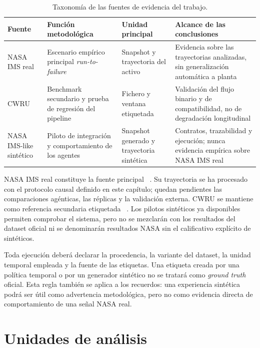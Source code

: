 \begin{table}[htbp]
\centering
\caption{Taxonomía de las fuentes de evidencia del trabajo.}\label{tab:taxonomia_evidencia}
\small
\begin{tabularx}{\textwidth}{>{\raggedright\arraybackslash}p{}Y>{\raggedright\arraybackslash}p{0.18\textwidth}Y}
\toprule
Fuente & Función metodológica & Unidad principal & Alcance de las conclusiones \\
\midrule
NASA IMS real & Escenario empírico principal \textit{run-to-failure} & Snapshot y trayectoria del activo & Evidencia sobre las trayectorias analizadas, sin generalización automática a planta \\
CWRU & Benchmark secundario y prueba de regresión del pipeline & Fichero y ventana etiquetada & Validación del flujo binario y de compatibilidad, no de degradación longitudinal \\
NASA IMS-like sintético & Piloto de integración y comportamiento de los agentes & Snapshot generado y trayectoria sintética & Contratos, trazabilidad y ejecución; nunca evidencia empírica sobre NASA IMS real \\
\bottomrule
\end{tabularx}
\end{table}

NASA IMS real constituye la fuente principal
~\cite{nasa_pcoe_repository,nasa_ims_bearings_zip}. Su trayectoria se ha
procesado con el protocolo causal definido en este capítulo; quedan pendientes
las comparaciones agénticas, las réplicas y la validación externa. CWRU se
mantiene como referencia secundaria etiquetada
~\cite{cwru_bearing_data_center,cwru_normal_baseline,cwru_12k_drive_end}. Los
pilotos sintéticos ya disponibles permiten comprobar el sistema, pero no se
mezclarán con los resultados del dataset oficial ni se denominarán resultados
NASA sin el calificativo explícito de sintéticos.

Toda ejecución deberá declarar la procedencia, la variante del dataset, la
unidad temporal empleada y la fuente de las etiquetas. Una etiqueta creada por
una política temporal o por un generador sintético no se tratará como
\textit{ground truth} oficial. Esta regla también se aplica a los recuerdos: una
experiencia sintética podrá ser útil como advertencia metodológica, pero no como
evidencia directa de comportamiento de una señal NASA real.

\section{Unidades de análisis}

